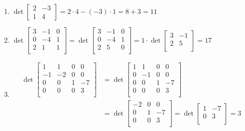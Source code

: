 \documentclass{article}
\begin{document}
\begin{enumerate}
    \item $
        \det\begin{bmatrix}2 & -3 \\ 1 & 4\end{bmatrix} =
        2 \cdot 4 - (-3) \cdot 1 = 8 + 3 = 11
    $
    \item $
        \det\begin{bmatrix}
            3 & -1 & 0 \\
            0 & -4 & 1 \\
            2 & 1 & 1 \\
        \end{bmatrix} = \det\begin{bmatrix}
            3 & -1 & 0 \\
            0 & -4 & 1 \\
            2 & 5 & 0 \\
        \end{bmatrix} = 1 \cdot \det\begin{bmatrix}
            3 & -1 \\
            2 &  5 \\
        \end{bmatrix} = 17
    $
    \item \[\begin{aligned}
        \det\begin{bmatrix}
            1 & 1 & 0 & 0 \\
            -1 & -2 & 0 & 0 \\
            0 & 0 & 1 & -7 \\
            0 & 0 & 0 & 3 \\
        \end{bmatrix} &= \det\begin{bmatrix}
            1 & 1 & 0 & 0 \\
            0 & -1 & 0 & 0 \\
            0 & 0 & 1 & -7 \\
            0 & 0 & 0 & 3 \\
        \end{bmatrix} \\ &= \det\begin{bmatrix}
            -2 & 0 & 0 \\
            0 & 1 & -7 \\
            0 & 0 & 3 \\
        \end{bmatrix} = \det\begin{bmatrix}
            1 & -7 \\
            0 & 3 \\
        \end{bmatrix} = 3
    \end{aligned}\]
\end{enumerate}
\end{document}
